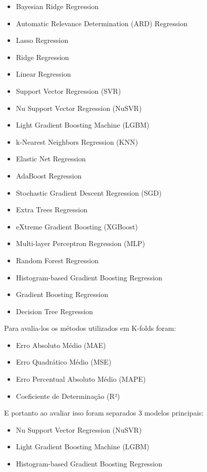 \documentclass[journal]{IEEEtran}
\begin{document}
\begin{itemize}
    \item {Bayesian Ridge Regression}
    \item {Automatic Relevance Determination (ARD) Regression}
    \item {Lasso Regression}
    \item {Ridge Regression}
    \item {Linear Regression}
    \item {Support Vector Regression (SVR)}
    \item {Nu Support Vector Regression (NuSVR)}
    \item {Light Gradient Boosting Machine (LGBM)}
    \item {k-Nearest Neighbors Regression (KNN)}
    \item {Elastic Net Regression}
    \item {AdaBoost Regression}
    \item {Stochastic Gradient Descent Regression (SGD)}
    \item {Extra Trees Regression}
    \item {eXtreme Gradient Boosting (XGBoost)}
    \item {Multi-layer Perceptron Regression (MLP)}
    \item {Random Forest Regression}
    \item {Histogram-based Gradient Boosting Regression}
    \item {Gradient Boosting Regression}
    \item {Decision Tree Regression}
\end{itemize}

Para avalia-los os métodos utilizados em K-folds foram:

\begin{itemize}
    \item Erro Absoluto Médio (MAE)
    \item Erro Quadrático Médio (MSE)
    \item Erro Percentual Absoluto Médio (MAPE)
    \item Coeficiente de Determinação (R²)
\end{itemize}

E portanto ao avaliar isso foram separados 3 modelos principais:

\begin{itemize}
    \item {Nu Support Vector Regression (NuSVR)}
    \item {Light Gradient Boosting Machine (LGBM)}
    \item {Histogram-based Gradient Boosting Regression}
\end{itemize}
\end{document}
